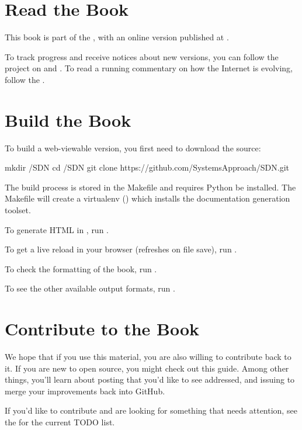 \documentclass[letterpaper,11pt,english]{sphinxmanual}
\begin{document}
\section{Read the Book}
\label{\detokenize{README:read-the-book}}
This book is part of the , with an online version published
at .

To track progress and receive notices about new versions, you can follow
the project on
and . To read a running
commentary on how the Internet is evolving, follow the .


\section{Build the Book}
\label{\detokenize{README:build-the-book}}
To build a web-viewable version, you first need to download the source:

\begin{sphinxVerbatim}[commandchars=\\\{\}]
\PYGZdl{} mkdir \PYGZti{}/SDN
\PYGZdl{} cd \PYGZti{}/SDN
\PYGZdl{} git clone https://github.com/SystemsApproach/SDN.git
\end{sphinxVerbatim}

The build process is stored in the Makefile and requires Python be
installed. The Makefile will create a virtualenv () which
installs the documentation generation toolset.

To generate HTML in ,  run .

To get a live reload in your browser (refreshes on file save), run .

To check the formatting of the book, run .

To see the other available output formats, run .


\section{Contribute to the Book}
\label{\detokenize{README:contribute-to-the-book}}
We hope that if you use this material, you are also willing to
contribute back to it. If you are new to open source, you might check
out this  guide. Among
other things, you’ll learn about posting  that you’d like to see
addressed, and issuing  to merge your improvements back
into GitHub.

If you’d like to contribute and are looking for something that needs
attention, see the 
for the current TODO list.



\renewcommand{\indexname}{Index}
\printindex
\end{document}
